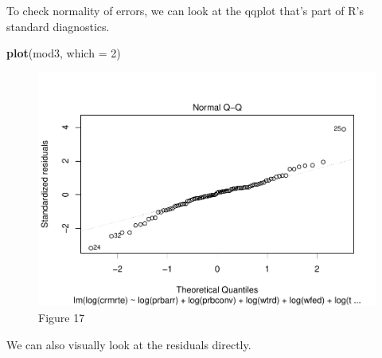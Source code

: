 \documentclass[]{article}
\newenvironment{Shaded}{\begin{snugshade}}{\end{snugshade}}
\newcommand{\DataTypeTok}[1]{\textcolor[rgb]{0.13,0.29,0.53}{#1}}
\newcommand{\DecValTok}[1]{\textcolor[rgb]{0.00,0.00,0.81}{#1}}
\newcommand{\KeywordTok}[1]{\textcolor[rgb]{0.13,0.29,0.53}{\textbf{#1}}}
\newcommand{\NormalTok}[1]{#1}
\newcommand{\OperatorTok}[1]{\textcolor[rgb]{0.81,0.36,0.00}{\textbf{#1}}}
\newcommand{\StringTok}[1]{\textcolor[rgb]{0.31,0.60,0.02}{#1}}
\begin{document}
To check normality of errors, we can look at the qqplot that's part of
R's standard diagnostics.

\begin{Shaded}
\begin{Highlighting}[]
\KeywordTok{plot}\NormalTok{(mod3, }\DataTypeTok{which =} \DecValTok{2}\NormalTok{)}
\end{Highlighting}
\end{Shaded}

\begin{figure}

{\centering \includegraphics{lab_3_v7_files/figure-latex/unnamed-chunk-49-1} 

}

\caption{Figure 17}\label{fig:unnamed-chunk-49}
\end{figure}

We can also visually look at the residuals directly.

\begin{Shaded}
\end{Shaded}
\end{document}
